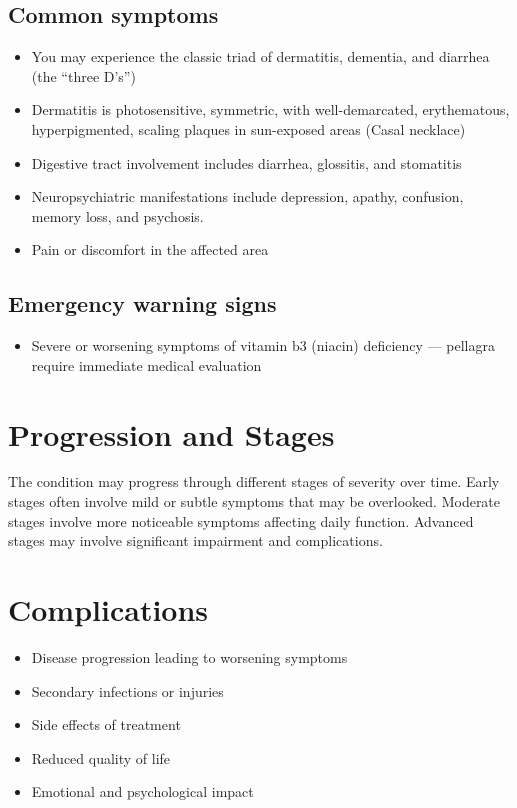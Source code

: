 \subsection{Common symptoms}
\begin{itemize}[noitemsep]
  \item You may experience the classic triad of dermatitis, dementia, and diarrhea (the ``three D's'')
  \item Dermatitis is photosensitive, symmetric, with well-demarcated, erythematous, hyperpigmented, scaling plaques in sun-exposed areas (Casal necklace)
  \item Digestive tract involvement includes diarrhea, glossitis, and stomatitis
  \item Neuropsychiatric manifestations include depression, apathy, confusion, memory loss, and psychosis.
  \item Pain or discomfort in the affected area
  \end{itemize}
\subsection{Emergency warning signs}
\begin{itemize}[noitemsep]
  \item Severe or worsening symptoms of vitamin b3 (niacin) deficiency --- pellagra require immediate medical evaluation
\end{itemize}
\section{Progression and Stages}
The condition may progress through different stages of severity over time. Early stages often involve mild or subtle symptoms that may be overlooked. Moderate stages involve more noticeable symptoms affecting daily function. Advanced stages may involve significant impairment and complications.
\section{Complications}
\begin{itemize}[noitemsep]
  \item Disease progression leading to worsening symptoms
  \item Secondary infections or injuries
  \item Side effects of treatment
  \item Reduced quality of life
  \item Emotional and psychological impact
\end{itemize}
